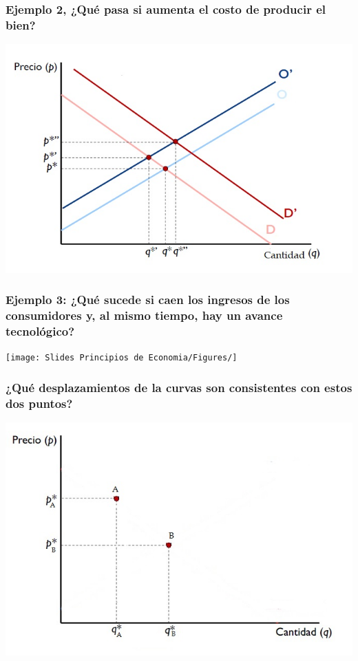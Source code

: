 \documentclass{beamer}
\begin{document}
\begin{frame}
\frametitle{Ejemplo 2, ¿Qué pasa si aumenta el costo de producir el bien?}
\centering
\includegraphics[scale=0.55]{Slides Principios de Economia/Figures/Tema_07.5_equilibrioofertademanda2.jpg}
\end{frame}

\begin{frame}
\frametitle{Ejemplo 3: ¿Qué sucede si caen los ingresos de los consumidores y, al mismo tiempo, hay un avance tecnológico?}
\centering
\texttt{[image: Slides Principios de Economia/Figures/]}
\end{frame}

\begin{frame}
\frametitle{¿Qué desplazamientos de la curvas son consistentes con estos dos puntos?}
\centering
\includegraphics[scale=0.6]{Slides Principios de Economia/Figures/Tema_07.6_equilibrioofertademanda3.jpg}
\end{frame}
\end{document}
